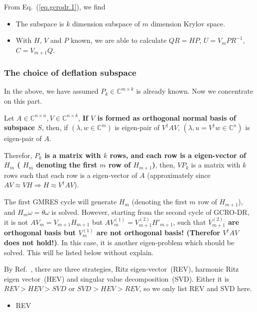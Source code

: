 From Eq.~(\ref{eq.gcrodr.1}), we find

\begin{itemize}
  \item The subspace is $k$ dimension subspace of $m$ dimension Krylov space.
  \item With $H$, $V$ and $P$ known, we are able to calculate $QR=HP$, $U=V_mPR^{-1}$, $C=V_{m+1}Q$.
\end{itemize}

\subsubsection{\label{sec:deflationsubspace}The choice of deflation subspace}

In the above, we have assumed $P_k\in \mathbb{C}^{m\times k}$ is already known. Now we concentrate on this part. 

Let $A\in \mathbb{C}^{n\times n},V\in \mathbb{C}^{n\times k}$, \textbf{If $V$ is formed as orthogonal normal basis of subspace $S$}, then, if $(\lambda, w\in \mathbb{C}^m)$ is eigen-pair of $V^{\dagger}AV$, $(\lambda, u=V^{\dagger}w\in \mathbb{C}^n)$ is eigen-pair of $A$.

Therefor, \textcolor[rgb]{0,0,1}{\textbf{$P_k$ is a matrix with $k$ rows, and each row is a eigen-vector of $H_m$ ( $H_m$ denoting the first $m$ row of $H_{m+1}$)}}, then, $VP_k$ is a matrix with $k$ rows such that each row is a eigen-vector of $A$ (approximately since $AV\approx VH \Rightarrow H \approx V^{\dagger}AV$).

The first GMRES cycle will generate $H_m$ (denoting the first $m$ row of $H_{m+1}$), and $H_m\omega=\theta \omega$ is solved. However, starting from the second cycle of GCRO-DR, it is not $AV_m=V_{m+1}H_{m+1}$ but $AV_m^{(1)}=V_{m+1}^{(2)}H'_{m+1}$, such that \textcolor[rgb]{1,0,0}{\textbf{$V_{m+1}^{(2)}$ are orthogonal basis but $V_{m}^{(1)}$ are not orthogonal basis! (Therefor $V^{\dagger}AV$ does not hold!)}}. In this case, it is another eigen-problem which should be solved. This will be listed below without explain.

By Ref.~\cite{deflation}, there are three strategies, Ritz eigen-vector~(REV), harmonic Ritz eigen vector~(HEV) and singular value decomposition~(SVD). Either it is $REV>HEV>SVD$ or $SVD>HEV>REV$, so we only list REV and SVD here.

\begin{itemize}
  \item REV
\end{itemize}

